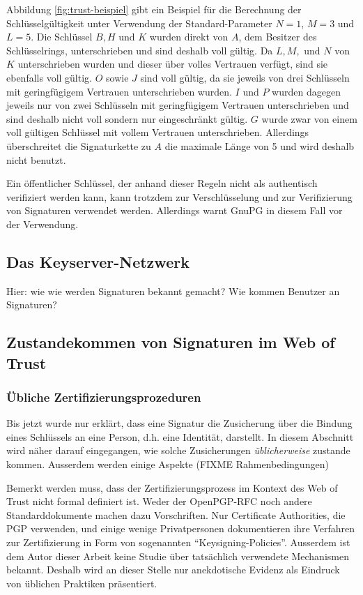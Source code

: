 Abbildung \ref{fig:trust-beispiel} gibt ein Beispiel für die
Berechnung der Schlüsselgültigkeit unter Verwendung der
Standard-Parameter $N=1$, $M=3$ und $L=5$. Die Schlüssel $B, H$ und
$K$ wurden direkt von $A$, dem Besitzer des Schlüsselrings,
unterschrieben und sind deshalb voll gültig. Da $L, M,$ und $N$ von
$K$ unterschrieben wurden und dieser über volles Vertrauen verfügt,
sind sie ebenfalls voll gültig. $O$ sowie $J$ sind voll gültig, da sie
jeweils von drei Schlüsseln mit geringfügigem Vertrauen unterschrieben
wurden. $I$ und $P$ wurden dagegen jeweils nur von zwei Schlüsseln mit
geringfügigem Vertrauen unterschrieben und sind deshalb nicht voll
sondern nur eingeschränkt gültig. $G$ wurde zwar von einem voll
gültigen Schlüssel mit vollem Vertrauen unterschrieben. Allerdings
überschreitet die Signaturkette zu $A$ die maximale Länge von 5 und
wird deshalb nicht benutzt.

Ein öffentlicher Schlüssel, der anhand dieser Regeln nicht als
authentisch verifiziert werden kann, kann trotzdem zur Verschlüsselung
und zur Verifizierung von Signaturen verwendet werden. Allerdings
warnt GnuPG in diesem Fall vor der Verwendung.

\subsection{Das Keyserver-Netzwerk}
\label{sec:das-keys-netzw}

Hier: wie wie werden Signaturen bekannt gemacht? Wie kommen Benutzer
an Signaturen?

\subsection{Zustandekommen von Signaturen im Web of Trust}
\label{sec:sozi-komp-des}

\subsubsection{\"Ubliche Zertifizierungsprozeduren}
\label{sec:ubliche-zert}

Bis jetzt wurde nur erkl\"art, dass eine Signatur die
Zusicherung \"uber die Bindung eines Schl\"ussels an eine Person,
d.h. eine Identit\"at, darstellt. In diesem Abschnitt wird n\"aher
darauf eingegangen, wie solche Zusicherungen \emph{\"ublicherweise}
zustande kommen. Ausserdem werden einige Aspekte (FIXME
Rahmenbedingungen)

Bemerkt werden muss, dass der Zertifizierungsprozess im Kontext des
Web of Trust nicht formal definiert ist. Weder der OpenPGP-RFC noch
andere Standarddokumente machen dazu Vorschriften. Nur Certificate
Authorities, die PGP verwenden, und einige wenige Privatpersonen
dokumentieren ihre Verfahren zur Zertifizierung in Form von
sogenannten ``Keysigning-Policies''. Ausserdem ist dem Autor dieser
Arbeit keine Studie \"uber tats\"achlich verwendete Mechanismen
bekannt. Deshalb wird an dieser Stelle nur anekdotische Evidenz
als Eindruck von \"ublichen Praktiken pr\"asentiert.

